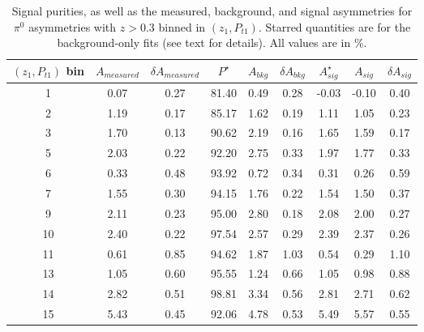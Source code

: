 \begin{table}[H]\footnotesize
\centering
\begin{tabular}{|c|c|c|c|c|c|c|c|c|}
\hline
$(z_{1},P_{t1})$ bin & $A_{measured}$ & $\delta A_{measured}$ & $P^{\star}$ & $A_{bkg}$ & $\delta A_{bkg}$ & $A_{sig}^{\star}$ & $ A_{sig}$  & $\delta A_{sig}$ \\ \hline\hline
  1 & 0.07 & 0.27 & 81.40 & 0.49 & 0.28 & -0.03 & -0.10 & 0.40 \\ \hline 
  2 & 1.19 & 0.17 & 85.17 & 1.62 & 0.19 & 1.11 & 1.05 & 0.23 \\ \hline 
  3 & 1.70 & 0.13 & 90.62 & 2.19 & 0.16 & 1.65 & 1.59 & 0.17 \\ \hline \hline
  5 & 2.03 & 0.22 & 92.20 & 2.75 & 0.33 & 1.97 & 1.77 & 0.33 \\ \hline 
  6 & 0.33 & 0.48 & 93.92 & 0.72 & 0.34 & 0.31 & 0.26 & 0.59 \\ \hline 
  7 & 1.55 & 0.30 & 94.15 & 1.76 & 0.22 & 1.54 & 1.50 & 0.37 \\ \hline \hline
  9 & 2.11 & 0.23 & 95.00 & 2.80 & 0.18 & 2.08 & 2.00 & 0.27 \\ \hline 
10 & 2.40 & 0.22 & 97.54 & 2.57 & 0.29 & 2.39 & 2.37 & 0.26 \\ \hline 
11 & 0.61 & 0.85 & 94.62 & 1.87 & 1.03 & 0.54 & 0.29 & 1.10 \\ \hline \hline
13 & 1.05 & 0.60 & 95.55 & 1.24 & 0.66 & 1.05 & 0.98 & 0.88 \\ \hline 
14 & 2.82 & 0.51 & 98.81 & 3.34 & 0.56 & 2.81 & 2.71 & 0.62 \\ \hline 
15 & 5.43 & 0.45 & 92.06 & 4.78 & 0.53 & 5.49 & 5.57 & 0.55 \\ \hline 
\end{tabular}
\caption[BG-correction quantities for $\pi^0$ asymmetries with $z>0.3$, $(z_1,P_{t1})$ bins]{Signal purities, as well as the measured, background, and signal asymmetries for $\pi^0$ asymmetries with $z>0.3$ binned in $(z_1,P_{t1})$. Starred quantities are for the background-only fits (see text for details). All values are in \%.}
\label{tab:etazptbkgcor}
\end{table} 



